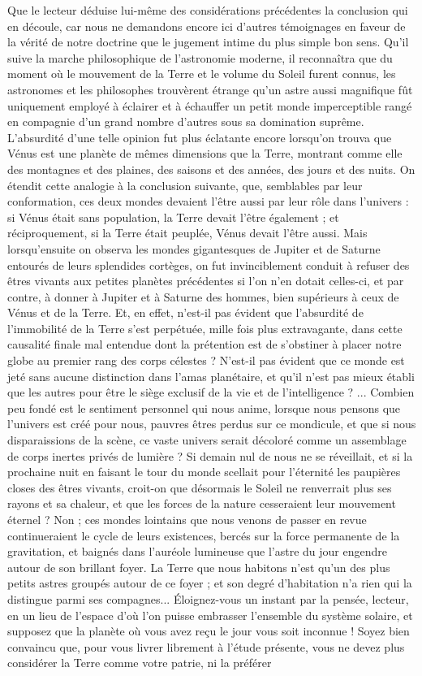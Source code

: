 \documentclass[a4paper, 11pt, oneside]{article}
\begin{document}
Que le lecteur déduise lui-même des considérations précédentes la conclusion qui en découle, car nous ne demandons encore ici d'autres témoignages en faveur de la vérité de notre doctrine que le jugement intime du plus simple bon sens. Qu'il suive la marche philosophique de l'astronomie moderne, il reconnaîtra que du moment où le mouvement de la Terre et le volume du Soleil furent connus, les astronomes et les philosophes trouvèrent étrange qu'un astre aussi magnifique fût uniquement employé à éclairer et à échauffer un petit monde imperceptible rangé en compagnie d'un grand nombre d'autres sous sa domination suprême. L'absurdité d'une telle opinion fut plus éclatante encore lorsqu'on trouva que Vénus est une planète de mêmes dimensions que la Terre, montrant comme elle des montagnes et des plaines, des saisons et des années, des jours et des nuits. On étendit cette analogie à la conclusion suivante, que, semblables par leur conformation, ces deux mondes devaient l'être aussi par leur rôle dans l'univers : si Vénus était sans population, la Terre devait l'être également ; et réciproquement, si la Terre était peuplée, Vénus devait l'être aussi. Mais lorsqu'ensuite on observa les mondes gigantesques de Jupiter et de Saturne entourés de leurs splendides cortèges, on fut invinciblement conduit à refuser des êtres vivants aux petites planètes précédentes si l'on n'en dotait celles-ci, et par contre, à donner à Jupiter et à Saturne des hommes, bien supérieurs à ceux de Vénus et de la Terre. Et, en effet, n'est-il pas évident que l'absurdité de l'immobilité de la Terre s'est perpétuée, mille fois plus extravagante, dans cette causalité finale mal entendue dont la prétention est de s'obstiner à placer notre globe au premier rang des corps célestes ? N'est-il pas évident que ce monde est jeté sans aucune distinction dans l'amas planétaire, et qu'il n'est pas mieux établi que les autres pour être le siège exclusif de la vie et de l'intelligence ? ... Combien peu fondé est le sentiment personnel qui nous anime, lorsque nous pensons que l'univers est créé pour nous, pauvres êtres perdus sur ce mondicule, et que si nous disparaissions de la scène, ce vaste univers serait décoloré comme un assemblage de corps inertes privés de lumière ? Si demain nul de nous ne se réveillait, et si la prochaine nuit en faisant le tour du monde scellait pour l'éternité les paupières closes des êtres vivants, croit-on que désormais le Soleil ne renverrait plus ses rayons et sa chaleur, et que les forces de la nature cesseraient leur mouvement éternel ? Non ; ces mondes lointains que nous venons de passer en revue continueraient le cycle de leurs existences, bercés sur la force permanente de la gravitation, et baignés dans l'auréole lumineuse que l'astre du jour engendre autour de son brillant foyer. La Terre que nous habitons n'est qu'un des plus petits astres groupés autour de ce foyer ; et son degré d'habitation n'a rien qui la distingue parmi ses compagnes... Éloignez-vous un instant par la pensée, lecteur, en un lieu de l'espace d'où l'on puisse embrasser l'ensemble du système solaire, et supposez que la planète où vous avez reçu le jour vous soit inconnue ! Soyez bien convaincu que, pour vous livrer librement à l'étude présente, vous ne devez plus considérer la Terre comme votre patrie, ni la préférer 
\end{document}

